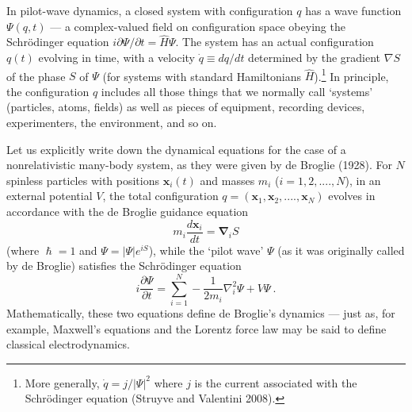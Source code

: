 \documentclass[12pt]{article}%
\begin{document}
In pilot-wave dynamics, a closed system with configuration $q$ has a wave
function $\Psi(q,t)$ --- a complex-valued field on configuration space obeying
the Schr\"{o}dinger equation $i\partial\Psi/\partial t=\hat{H}\Psi$. The
system has an actual configuration $q(t)$ evolving in time, with a velocity
$\dot{q}\equiv dq/dt$ determined by the gradient $\nabla S$ of the phase $S$
of $\Psi$ (for systems with standard Hamiltonians $\hat{H}$).\footnote{More
generally, $\dot{q}=j/|\Psi|^{2}$ where $j$ is the current associated with the
Schr\"{o}dinger equation (Struyve and Valentini 2008).} In principle, the
configuration $q$ includes all those things that we normally call `systems'
(particles, atoms, fields) as well as pieces of equipment, recording devices,
experimenters, the environment, and so on.

Let us explicitly write down the dynamical equations for the case of a
nonrelativistic many-body system, as they were given by de Broglie (1928). For
$N$ spinless particles with positions $\mathbf{x}_{i}(t)$ and masses $m_{i}$
($i=1,2,....,N$), in an external potential $V$, the total configuration
$q=(\mathbf{x}_{1},\mathbf{x}_{2},....,\mathbf{x}_{N})$ evolves in accordance
with the de Broglie guidance equation%
\begin{equation}
m_{i}\frac{d\mathbf{x}_{i}}{dt}=\mathbf{\nabla}_{i}S \label{geqn}%
\end{equation}
(where $\hslash=1$ and $\Psi=\left\vert \Psi\right\vert e^{iS}$), while the
`pilot wave' $\Psi$ (as it was originally called by de Broglie) satisfies the
Schr\"{o}dinger equation%
\begin{equation}
i\frac{\partial\Psi}{\partial t}=\sum_{i=1}^{N}-\frac{1}{2m_{i}}\nabla_{i}%
^{2}\Psi+V\Psi\ . \label{Seqn}%
\end{equation}
Mathematically, these two equations define de Broglie's dynamics --- just as,
for example, Maxwell's equations and the Lorentz force law may be said to
define classical electrodynamics.
\end{document}
